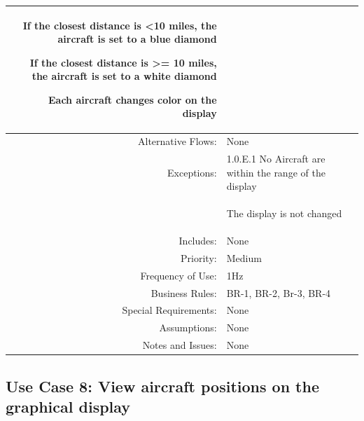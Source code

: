 \documentclass[12pt,oneside,letterpaper]{article}
\newenvironment{packed_enumerate}{ %
\vspace{-7mm}
\begin{enumerate}
  \setlength{\itemsep}{0pt}
  \setlength{\parskip}{0pt}
  \setlength{\parsep}{0pt}
}{\end{enumerate}
\vspace{-8mm}}
\begin{document}
\begin{longtable}{|r|p{3.8in}|}
\begin{packed_enumerate}
\begin{packed_enumerate}
\item If the closest distance is \textless 10 miles, the aircraft is set to a blue diamond
\item If the closest distance is \textgreater= 10 miles, the aircraft is set to a white diamond\newline
\end{packed_enumerate}
Each aircraft changes color on the display 
\end{packed_enumerate}\\
\hline
Alternative Flows:&None\\
\hline
Exceptions:&1.0.E.1 No Aircraft are within the range of the display\\
& %
\begin{packed_enumerate}
\item The display is not changed
\end{packed_enumerate}\\
\hline
Includes:&None\\
\hline
Priority:&Medium\\
\hline
Frequency of Use:&1Hz\\
\hline
Business Rules:&BR-1, BR-2, Br-3, BR-4\\
\hline
Special Requirements:&None\\
\hline
Assumptions:&None\\
\hline
Notes and Issues:&None\\
\hline
\end{longtable}

\subsection{\label{View positions}Use Case 8: View aircraft positions on the graphical display}
\end{document}
